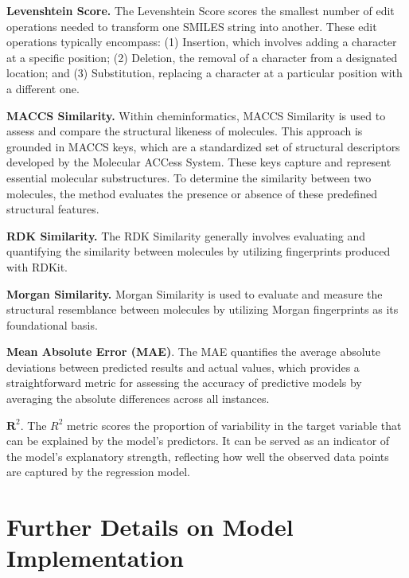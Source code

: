 \textbf{Levenshtein Score.} The Levenshtein Score scores the smallest number of edit operations needed to transform one SMILES string into another. These edit operations typically encompass: (1) Insertion, which involves adding a character at a specific position; (2) Deletion, the removal of a character from a designated location; and (3) Substitution, replacing a character at a particular position with a different one.

\textbf{MACCS Similarity.} Within cheminformatics, MACCS Similarity is used to assess and compare the structural likeness of molecules. This approach is grounded in MACCS keys, which are a standardized set of structural descriptors developed by the Molecular ACCess System. These keys capture and represent essential molecular substructures. To determine the similarity between two molecules, the method evaluates the presence or absence of these predefined structural features.

\textbf{RDK Similarity.} The RDK Similarity generally involves evaluating and quantifying the similarity between molecules by utilizing fingerprints produced with RDKit.

\textbf{Morgan Similarity.} Morgan Similarity is used to evaluate and measure the structural resemblance between molecules by utilizing Morgan fingerprints as its foundational basis.

\textbf{Mean Absolute Error (MAE)}. The MAE quantifies the average absolute deviations between predicted results and actual values, which provides a straightforward metric for assessing the accuracy of predictive models by averaging the absolute differences across all instances.

{$\mathbf{R}^2$}. The $R^2$ metric scores the proportion of variability in the target variable that can be explained by the model's predictors. It can be served as an indicator of the model's explanatory strength, reflecting how well the observed data points are captured by the regression model.

\section{Further Details on Model Implementation}
\label{app:model imp}
